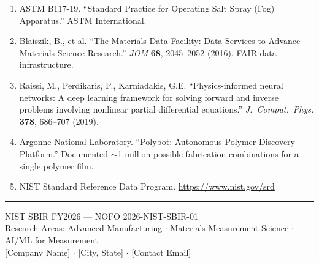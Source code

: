 \documentclass[11pt,letterpaper]{article}
\begin{document}
\begin{enumerate}[leftmargin=*]
  \item ASTM B117-19. ``Standard Practice for Operating Salt Spray (Fog) Apparatus.'' ASTM International.

  \item Blaiszik, B., et al. ``The Materials Data Facility: Data Services to Advance Materials Science Research.'' \textit{JOM} \textbf{68}, 2045--2052 (2016). FAIR data infrastructure.

  \item Raissi, M., Perdikaris, P., Karniadakis, G.E. ``Physics-informed neural networks: A deep learning framework for solving forward and inverse problems involving nonlinear partial differential equations.'' \textit{J.\ Comput.\ Phys.} \textbf{378}, 686--707 (2019).

  \item Argonne National Laboratory. ``Polybot: Autonomous Polymer Discovery Platform.'' Documented $\sim$1 million possible fabrication combinations for a single polymer film.

  \item NIST Standard Reference Data Program. \url{https://www.nist.gov/srd}
\end{enumerate}

\vspace{1cm}
\noindent\textcolor{nistblue}{\rule{\textwidth}{1.5pt}}

\begin{center}
\small\textcolor{nistgray}{
  NIST SBIR FY2026 --- NOFO 2026-NIST-SBIR-01\\
  Research Areas: Advanced Manufacturing $\cdot$ Materials Measurement Science $\cdot$ AI/ML for Measurement\\[0.2cm]
  [Company Name] $\cdot$ [City, State] $\cdot$ [Contact Email]
}
\end{center}
\end{document}
